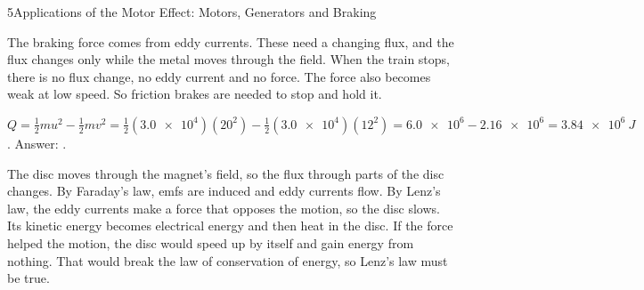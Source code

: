 \begin{chapteranswers}{5}{Applications of the Motor Effect: Motors, Generators and Braking}
  \item The braking force comes from eddy currents. These need a changing flux, and the
        flux changes only while the metal moves through the field. When the train
        stops, there is no flux change, no eddy current and no force. The force also
        becomes weak at low speed. So friction brakes are needed to stop and hold it.
  \item $Q = \tfrac{1}{2}mu^2 - \tfrac{1}{2}mv^2
        = \tfrac{1}{2}(\num{3.0e4})(20^2) - \tfrac{1}{2}(\num{3.0e4})(12^2)
        = \num{6.0e6} - \num{2.16e6} = \qty{3.84e6}{J}$.
        Answer: .
  \item The disc moves through the magnet's field, so the flux through parts of the
        disc changes. By Faraday's law, emfs are induced and eddy currents flow. By
        Lenz's law, the eddy currents make a force that opposes the motion, so the disc
        slows. Its kinetic energy becomes electrical energy and then heat in the disc.
        If the force helped the motion, the disc would speed up by itself and gain
        energy from nothing. That would break the law of conservation of energy, so
        Lenz's law must be true.
\end{chapteranswers}
